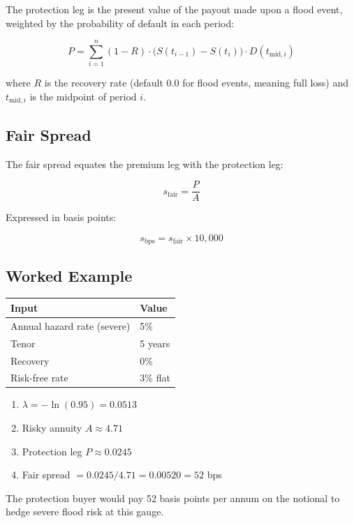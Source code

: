 \documentclass[11pt,a4paper]{article}
\begin{document}
The protection leg is the present value of the payout made upon a flood
event, weighted by the probability of default in each period:

\[
  P = \sum_{i=1}^{n} (1 - R) \cdot \bigl(S(t_{i-1}) - S(t_i)\bigr)
      \cdot D(t_{\mathrm{mid},i})
\]

\noindent where $R$ is the recovery rate (default 0.0 for flood events,
meaning full loss) and $t_{\mathrm{mid},i}$ is the midpoint of period $i$.

\subsection{Fair Spread}

The fair spread equates the premium leg with the protection leg:

\[
  s_{\mathrm{fair}} = \frac{P}{A}
\]

\noindent Expressed in basis points:

\[
  s_{\mathrm{bps}} = s_{\mathrm{fair}} \times 10{,}000
\]

\subsection{Worked Example}

\begin{center}
\begin{tabular}{ll}
\toprule
\textbf{Input} & \textbf{Value} \\
\midrule
Annual hazard rate (severe)  & 5\% \\
Tenor                        & 5 years \\
Recovery                     & 0\% \\
Risk-free rate               & 3\% flat \\
\bottomrule
\end{tabular}
\end{center}

\begin{enumerate}
  \item $\lambda = -\ln(0.95) = 0.0513$
  \item Risky annuity $A \approx 4.71$
  \item Protection leg $P \approx 0.0245$
  \item Fair spread $= 0.0245 / 4.71 = 0.00520 = 52$ bps
\end{enumerate}

\noindent The protection buyer would pay 52 basis points per annum on
the notional to hedge severe flood risk at this gauge.
\end{document}
